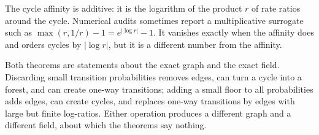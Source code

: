 \begin{remark}
The cycle affinity is additive: it is the logarithm of the product $r$ of rate ratios around the cycle.
Numerical audits sometimes report a multiplicative surrogate such as $\max(r,1/r)-1=e^{|\log r|}-1$.
It vanishes exactly when the affinity does and orders cycles by $|\log r|$, but it is a different number from the affinity.
\end{remark}

\begin{remark}
Both theorems are statements about the exact graph and the exact field.
Discarding small transition probabilities removes edges, can turn a cycle into a forest, and can create one-way transitions; adding a small floor to all probabilities adds edges, can create cycles, and replaces one-way transitions by edges with large but finite log-ratios.
Either operation produces a different graph and a different field, about which the theorems say nothing.
\end{remark}
